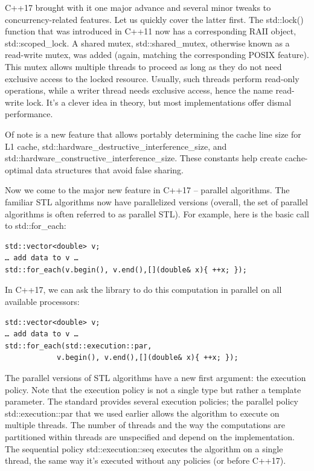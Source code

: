 C++17 brought with it one major advance and several minor tweaks to concurrency-related features. Let us quickly cover the latter first. The std::lock() function that was introduced in C++11 now has a corresponding RAII object, std::scoped\_lock. A shared mutex, std::shared\_mutex, otherwise known as a read-write mutex, was added (again, matching the corresponding POSIX feature). This mutex allows multiple threads to proceed as long as they do not need exclusive access to the locked resource. Usually, such threads perform read-only operations, while a writer thread needs exclusive access, hence the name read-write lock. It's a clever idea in theory, but most implementations offer dismal performance. 

Of note is a new feature that allows portably determining the cache line size for L1 cache, std::hardware\_destructive\_interference\_size, and std::hardware\_constructive\_interference\_size. These constants help create cache-optimal data structures that avoid false sharing.

Now we come to the major new feature in C++17 – parallel algorithms. The familiar STL algorithms now have parallelized versions (overall, the set of parallel algorithms is often referred to as parallel STL). For example, here is the basic call to std::for\_each:

\begin{lstlisting}[style=styleCXX]
std::vector<double> v;
… add data to v … 
std::for_each(v.begin(), v.end(),[](double& x){ ++x; });
\end{lstlisting}

In C++17, we can ask the library to do this computation in parallel on all available processors:

\begin{lstlisting}[style=styleCXX]
std::vector<double> v;
… add data to v … 
std::for_each(std::execution::par,
			v.begin(), v.end(),[](double& x){ ++x; });
\end{lstlisting}

The parallel versions of STL algorithms have a new first argument: the execution policy. Note that the execution policy is not a single type but rather a template parameter. The standard provides several execution policies; the parallel policy std::execution::par that we used earlier allows the algorithm to execute on multiple threads. The number of threads and the way the computations are partitioned within threads are unspecified and depend on the implementation. The sequential policy std::execution::seq executes the algorithm on a single thread, the same way it's executed without any policies (or before C++17).

